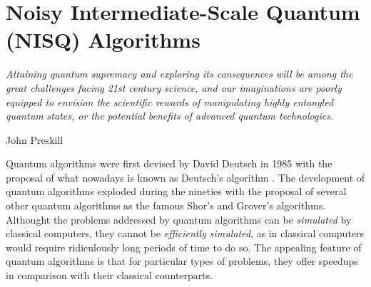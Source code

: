 \chapter{Noisy Intermediate-Scale Quantum (NISQ) Algorithms} %
\label{chpt:shortqcomp}




\epigraph{\vspace{-1.5cm}\textit{Attaining quantum supremacy and exploring its consequences will be among the great challenges facing 21st century science, and our imaginations are poorly equipped to envision the scientific rewards of manipulating highly entangled quantum states, or the potential benefits of advanced quantum technologies.}}{John Preskill \cite{Preskill2012}} %




Quantum algorithms were first devised by David Deutsch in 1985 with the proposal of what nowadays is known as Deutsch's algorithm \cite{Deutsch1985}. The development of quantum algorithms exploded during the nineties with the proposal of several other quantum algorithms \cite{AM2016, zoo} as the famous Shor's and Grover's algorithms. Althought the problems addressed by quantum algorithms can be \emph{simulated} by classical computers, they cannot be \emph{efficiently simulated}, as in classical computers would require ridiculously long periods of time to do so. The appealing feature of quantum algorithms is that for particular types of problems, they offer speedups in comparison with their classical counterparts. 

